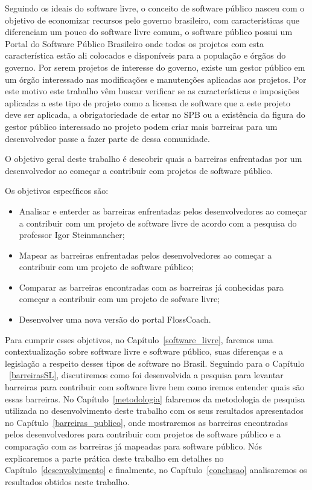Seguindo os ideais do software livre, o conceito de software público nasceu com o
objetivo de economizar recursos pelo governo brasileiro, com características que 
diferenciam um pouco do software livre comum, o software público possui um
Portal do Software Público Brasileiro onde todos os projetos com esta característica
estão ali colocados e disponíveis para a população e órgãos do governo. Por serem
projetos de interesse do governo, existe um gestor público em um órgão interessado 
nas modificações e manutenções aplicadas aos projetos. Por este motivo este trabalho 
vêm buscar verificar se as características e imposições aplicadas a este tipo de projeto 
como a licensa de software que a este projeto deve ser aplicada, a obrigatoriedade de
estar no SPB ou a existência da figura do gestor público interessado no projeto podem
criar mais barreiras para um desenvolvedor passe a fazer parte de dessa comunidade.


O objetivo geral deste trabalho é descobrir quais a barreiras enfrentadas por um 
desenvolvedor ao começar a contribuir com projetos de software público.

Os objetivos específicos são:

\begin{itemize}
\item Analisar e enterder as barreiras enfrentadas pelos desenvolvedores ao começar
a contribuir com um projeto de software livre de acordo com a pesquisa do professor
Igor Steinmancher;
\item Mapear as barreiras enfrentadas pelos desenvolvedores ao começar a contribuir
com um projeto de software público;
\item Comparar as barreiras encontradas com as barreiras já conhecidas para começar 
a contribuir com um projeto de sofware livre;
\item Desenvolver uma nova versão do portal FlossCoach.
\end{itemize}

Para cumprir esses objetivos, no Capítulo~\ref{software_livre}, faremos uma 
contextualização sobre software livre e software público, suas diferenças e a 
legislação a respeito desses tipos de software no Brasil. Seguindo para o Capítulo
~\ref{barreirasSL}, discutiremos como foi desenvolvida a pesquisa para levantar
barreiras para contribuir com software livre bem como iremos entender quais são
essas barreiras. No Capítulo~\ref{metodologia} falaremos da metodologia de pesquisa
utilizada no desenvolvimento deste trabalho com os seus resultados apresentados no
Capítulo~\ref{barreiras_publico}, onde mostraremos as barreiras encontradas pelos
desenvolvedores para contribuir com projetos de software público e a comparação com 
as barreiras já mapeadas para software público. Nós explicaremos a parte prática deste
trabalho em detalhes no Capítulo~\ref{desenvolvimento} e finalmente, no Capítulo~\ref{conclusao}
analisaremos os resultados obtidos neste trabalho.


